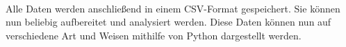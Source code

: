 \\
Alle Daten werden anschließend in einem CSV-Format gespeichert.
Sie können nun beliebig aufbereitet und analysiert werden.
Diese Daten können nun auf verschiedene Art und Weisen mithilfe von Python dargestellt werden.
